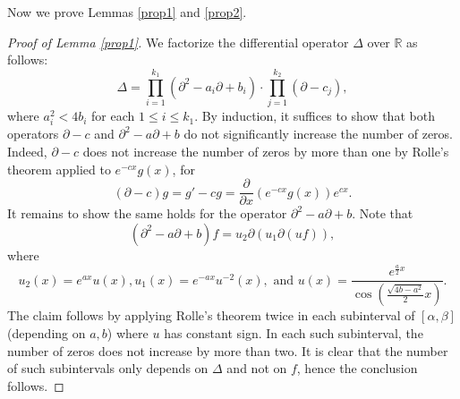 \documentclass[12pt, a4paper]{amsart}
\theoremstyle{remark}
\begin{document}
Now we prove Lemmas \ref{prop1} and \ref{prop2}. 

\begin{proof}[Proof of Lemma \ref{prop1}] We factorize the differential operator $\Delta$ over $\mathbb R$ as follows: 
\begin{equation}\nonumber
    \Delta = \prod_{i=1}^{k_1}(\partial^2 - a_i\partial + b_i) \cdot\prod_{j=1}^{k_2}(\partial -c_j),
\end{equation} where $a_i^2 <4b_i$ for each $1\leq i\leq k_1$. By induction, it suffices to show that both operators $\partial - c$ and $\partial^2 -a\partial + b$ do not significantly increase the number of zeros. Indeed, $\partial - c$ does not increase the number of zeros by more than one by Rolle's theorem applied to $e^{-cx}g(x)$, for 
\begin{equation}\nonumber
(\partial - c)g = g'-cg = \frac{\partial}{\partial x}(e^{-cx} g(x) )e^{cx}.
\end{equation}
It remains to show the same holds for the operator $\partial^2 - a\partial + b$. Note that 
\begin{equation}\nonumber
    (\partial^2 - a\partial + b)f = u_2\partial\left(u_1\partial(uf) \right),
\end{equation}
where 
\begin{equation}\nonumber
    u_2(x) = e^{ax}u(x), u_1(x) = e^{-ax}u^{-2}(x),\text{ and } u(x) = \frac{e^{\frac{a}{2}x}}{\cos\left(\frac{\sqrt{4b-a^2}}{2}x\right)}.
\end{equation}
The claim follows by applying Rolle's theorem twice in each subinterval of $[\alpha, \beta]$ (depending on $a, b$) where $u$ has constant sign. In each such subinterval, the number of zeros does not increase by more than two. It is clear that the number of such subintervals only depends on $\Delta$ and not on $f$, hence the conclusion follows. \end{proof}
\end{document}
